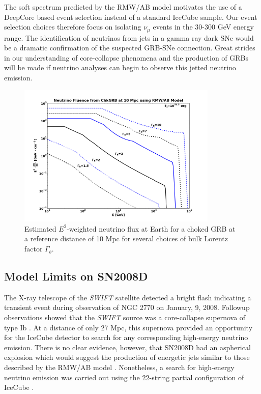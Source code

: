 \documentclass{gatech-thesis}
\begin{document}
The soft spectrum predicted by the RMW/AB model motivates the use of a DeepCore based event selection instead of a standard IceCube sample. Our event selection choices therefore focus on isolating $\nu_{\mu}$ events in the 30-300 GeV energy range. The identification of neutrinos from jets in a gamma ray dark SNe would be a dramatic confirmation of the suspected GRB-SNe connection. Great strides in our understanding of core-collapse phenomena and the production of GRBs will be made if neutrino analyses can begin to observe this jetted neutrino emission.

\begin{figure}[ht]
  \begin{center}
    \includegraphics[width=0.85\textwidth,keepaspectratio]{ChkGRBFluxPlot.png}
  \end{center}
  \caption[Choked GRB Flux at Earth for different bulk Lorentz factor $\Gamma_b$]{Estimated $E^{2}$-weighted neutrino flux at Earth for a choked GRB at a reference distance of 10 Mpc for several choices of bulk Lorentz factor $\Gamma_b$.}
  \label{fig:fluxplot_multiplejetparams}
\end{figure}

\subsection{Model Limits on SN2008D}
The X-ray telescope of the \textit{SWIFT} satellite detected a bright flash indicating a transient event during observation of NGC 2770 on January, 9, 2008. Followup observations showed that the \textit{SWIFT} source was a core-collapse supernova of type Ib \cite{2008Natur.453..469S}. At a distance of only 27 Mpc, this supernova provided an opportunity for the IceCube detector to search for any corresponding high-energy neutrino emission. There is no clear evidence, however, that SN2008D had an aspherical explosion which would suggest the production of energetic jets similar to those described by the RMW/AB model \cite{2008Natur.453..469S}. Nonetheless, a search for high-energy neutrino emission was carried out using the 22-string partial configuration of IceCube \cite{2011A&A...527A..28I}.
\end{document}
